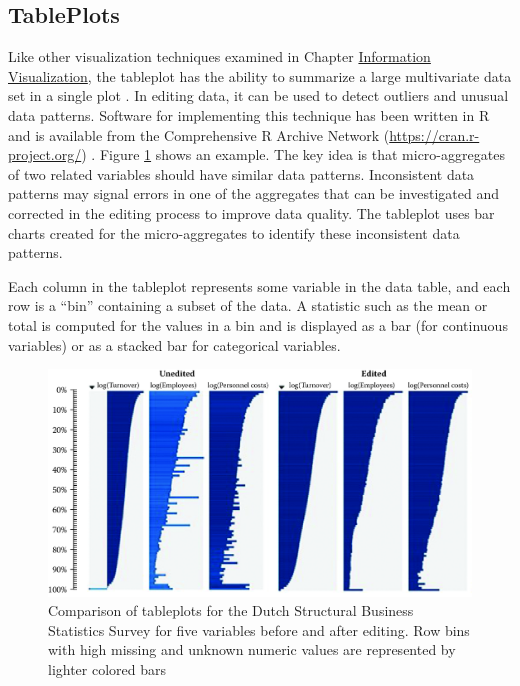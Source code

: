 \documentclass[]{krantz}
\begin{document}
\subsection{TablePlots}\label{tableplots}

Like other visualization techniques examined in Chapter
\protect\hyperlink{chap:viz}{Information Visualization}, the tableplot
has the ability to summarize a large multivariate data set in a single
plot \citep{malik2010interactive}. In editing data, it can be used to
detect outliers and unusual data patterns. Software for implementing
this technique has been written in R and is available from the
Comprehensive R Archive Network (\url{https://cran.r-project.org/})
\citep{cran2013}. Figure \ref{fig:fig10-7} shows an example. The key
idea is that micro-aggregates of two related variables should have
similar data patterns. Inconsistent data patterns may signal errors in
one of the aggregates that can be investigated and corrected in the
editing process to improve data quality. The tableplot uses bar charts
created for the micro-aggregates to identify these inconsistent data
patterns.

Each column in the tableplot represents some variable in the data table,
and each row is a ``bin'' containing a subset of the data. A statistic
such as the mean or total is computed for the values in a bin and is
displayed as a bar (for continuous variables) or as a stacked bar for
categorical variables.

\begin{figure}

{\centering \includegraphics[width=0.7\linewidth]{ChapterError/figures/fig10-7} 

}

\caption{Comparison of tableplots for the Dutch Structural Business Statistics Survey for five variables before and after editing. Row bins with high missing and unknown numeric values are represented by lighter colored bars}\label{fig:fig10-7}
\end{figure}
\end{document}
